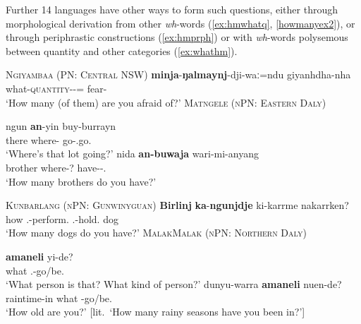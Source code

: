 \documentclass[12pt,egregdoesnotlikesansseriftitles]{scrartcl}
\begin{document}
Further 14 languages have other ways to form such questions, either through morphological derivation from other \textit{wh}-words (\ref{ex:hmwhatq}, \ref{howmanyex2}), or through periphrastic constructions (\ref{ex:hmprph}) or with \textit{wh}-words polysemous between quantity and other categories (\ref{ex:whathm}).
\begin{exe}
  \ex\label{ex:hmwhatq}\textsc{Ngiyambaa (PN: Central NSW)}\hfill {}
  \gll \textbf{minja}-\textbf{ŋalmaynj}-dji-waː=ndu giyanhdha-nha\\
  what-\textsc{quantity}-\Circ-\Excl=\Second\Nom{} fear-\Prs\\
  \glt `How many (of them) are you afraid of?'
  \ex \label{howmanyex2} \textsc{Matngele (nPN: Eastern Daly)}\hfill {}
  \begin{xlist}
    \ex \gll ngun \textbf{an}-yin buy-burrayn\\
    there where-\All{} go-\Third\Aug\Sbj.go.\Impv\\
    \glt `Where's that lot going?' %
    \ex \gll nida \textbf{an-buwaja} wari-mi-anyang\\
    brother where-? have-\Impv-\Second\Min\Sbj.\Prs\\
    \glt `How many brothers do you have?' %
  \end{xlist}
  \ex\label{ex:hmprph}\textsc{Kunbarlang (nPN: Gunwinyguan)}\hfill \citep{ikthesis}
  \gll \textbf{Birlinj} \textbf{ka}-\textbf{ngunjdje} ki-karrme nakarrken?\\
  how \Tsg.\Nfut-perform.\Np{} \Ssg.\Nfut-hold.\Np{} dog\\
  \glt `How many dogs do you have?' %
  \ex\label{ex:whathm}\textsc{MalakMalak (nPN: Northern Daly)}\hfill {}
  \begin{xlist}
    \ex\gll \textbf{amaneli} yi-de?\\
    what \Tsg.\M-go/be.\Prs\\
    \glt `What person is that? What kind of person?'
    \ex\gll dunyu-warra \textbf{amaneli} nuen-de?\\
    raintime-in what \Ssg-go/be.\Prs\\
    \glt `How old are you?' [lit.\ `How many rainy seasons have you been in?']
  \end{xlist}
\end{exe}
\end{document}
